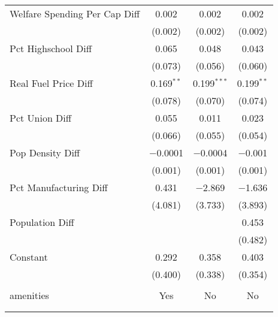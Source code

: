 \begin{table}[!htbp]
\begin{tabular}{@{\extracolsep{5pt}}lccc}
  Welfare Spending Per Cap Diff & 0.002 & 0.002 & 0.002 \\ 
  & (0.002) & (0.002) & (0.002) \\ 
  Pct Highschool Diff & 0.065 & 0.048 & 0.043 \\ 
  & (0.073) & (0.056) & (0.060) \\ 
  Real Fuel Price Diff & 0.169$^{**}$ & 0.199$^{***}$ & 0.199$^{**}$ \\ 
  & (0.078) & (0.070) & (0.074) \\ 
  Pct Union Diff & 0.055 & 0.011 & 0.023 \\ 
  & (0.066) & (0.055) & (0.054) \\ 
  Pop Density Diff & $-$0.0001 & $-$0.0004 & $-$0.001 \\ 
  & (0.001) & (0.001) & (0.001) \\ 
  Pct Manufacturing Diff & 0.431 & $-$2.869 & $-$1.636 \\ 
  & (4.081) & (3.733) & (3.893) \\ 
  Population Diff &  &  & 0.453 \\ 
  &  &  & (0.482) \\ 
  Constant & 0.292 & 0.358 & 0.403 \\ 
  & (0.400) & (0.338) & (0.354) \\ 
 \hline \\[-1.8ex] 
amenities & Yes & No & No \\ 
\hline \\[-1.8ex] 
\hline 
\hline \\[-1.8ex] 
\end{tabular} 
\end{table} 

